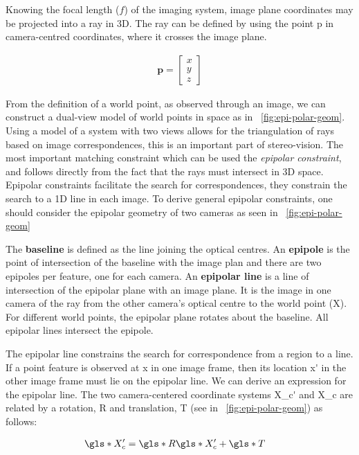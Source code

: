 \documentclass{osa-article}
\begin{document}
Knowing the focal length (\(f\)) of the imaging system, image plane coordinates may be projected into a ray in 3D.
The ray can be defined by using the point \gls*{p} in camera-centred coordinates, where it crosses the image plane.

\begin{align}
  \mathbf{p} = \begin{bmatrix}
        x\\y\\z
      \end{bmatrix}
\end{align}

From the definition of a world point, as observed through an image, we can construct a dual-view model of world points in space as in \figurename~\ref{fig:epi-polar-geom}.
Using a model of a system with two views allows for the triangulation of rays based on image correspondences, this is an important part of stereo-vision.
The most important matching constraint which can be used the \emph{epipolar constraint}, and follows directly from the fact that the rays must intersect in 3D space.
Epipolar constraints facilitate the search for correspondences, they constrain the search to a 1D line in each image.
To derive general epipolar constraints, one should consider the epipolar geometry of two cameras as seen in \figurename~\ref{fig:epi-polar-geom}


The \textbf{baseline} is defined as the line joining the optical centres.
An \textbf{epipole} is the point of intersection of the baseline with the image plan and there are two epipoles per feature, one for each camera.
An \textbf{epipolar line} is a line of intersection of the epipolar plane with an image plane.
It is the image in one camera of the ray from the other camera’s optical centre to the world point (\gls*{X}).
For different world points, the epipolar plane rotates about the baseline.
All epipolar lines intersect the epipole.

The epipolar line constrains the search for correspondence from a region to a line.
If a point feature is observed at \gls*{x} in one image frame, then its location \gls*{x'} in the other image frame must lie on the epipolar line.
We can derive an expression for the epipolar line.
The two camera-centered coordinate systems \gls*{X_c'} and \gls*{X_c} are related by a rotation, \gls*{R} and translation, \gls*{T} (see in \figurename~\ref{fig:epi-polar-geom}) as follows:

\begin{align}
    \gls*{X_c'} &= \gls*{R}\gls*{X_c'} + \gls*{T} \label{eq:Xprime = RTX}
\end{align}
\end{document}

